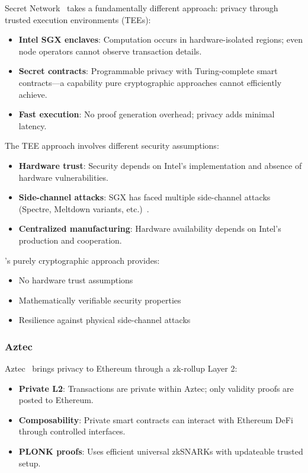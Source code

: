 Secret Network~\cite{secretnetwork} takes a fundamentally different
approach: privacy through trusted execution environments (TEEs):

\begin{itemize}
  \item \textbf{Intel SGX enclaves}: Computation occurs in hardware-isolated
    regions; even node operators cannot observe transaction details.
  \item \textbf{Secret contracts}: Programmable privacy with Turing-complete
    smart contracts---a capability pure cryptographic approaches cannot
    efficiently achieve.
  \item \textbf{Fast execution}: No proof generation overhead; privacy adds
    minimal latency.
\end{itemize}

The TEE approach involves different security assumptions:
\begin{itemize}
  \item \textbf{Hardware trust}: Security depends on Intel's implementation
    and absence of hardware vulnerabilities.
  \item \textbf{Side-channel attacks}: SGX has faced multiple side-channel
    attacks (Spectre, Meltdown variants, etc.)~\cite{sgx-attacks}.
  \item \textbf{Centralized manufacturing}: Hardware availability depends
    on Intel's production and cooperation.
\end{itemize}

\Botho's purely cryptographic approach provides:
\begin{itemize}
  \item No hardware trust assumptions
  \item Mathematically verifiable security properties
  \item Resilience against physical side-channel attacks
\end{itemize}

\subsubsection{Aztec}

Aztec~\cite{aztec} brings privacy to Ethereum through a zk-rollup Layer 2:

\begin{itemize}
  \item \textbf{Private L2}: Transactions are private within Aztec; only
    validity proofs are posted to Ethereum.
  \item \textbf{Composability}: Private smart contracts can interact with
    Ethereum DeFi through controlled interfaces.
  \item \textbf{PLONK proofs}: Uses efficient universal zkSNARKs with
    updateable trusted setup.
\end{itemize}

